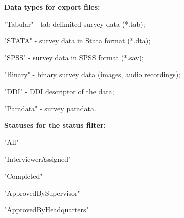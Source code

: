 \textbf{Data types for export files:}
\begin{compactitem}
    \item "Tabular" - tab-delimited survey data (*.tab);
    \item "STATA" - survey data in Stata format (*.dta);
    \item "SPSS" - survey data in SPSS format (*.sav);
    \item "Binary" - binary survey data (images, audio recordings);
    \item "DDI" - DDI descriptor of the data;
    \item "Paradata" - survey paradata.
\end{compactitem}

\par
\vskip24pt
\textbf{Statuses for the status filter:}
\begin{compactitem}
    \item "All"
    \item "InterviewerAssigned"
    \item  "Completed"
    \item "ApprovedBySupervisor"
    \item "ApprovedByHeadquarters"
\end{compactitem}
